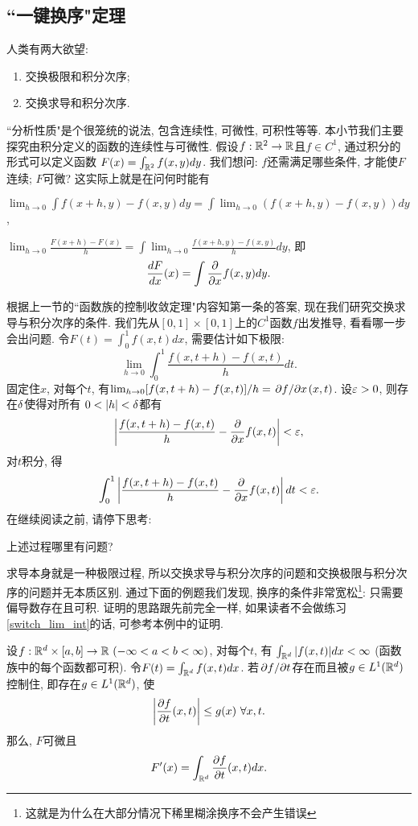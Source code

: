 \subsection{``一键换序"定理}
人类有两大欲望:
\begin{enumerate}
    \item 交换极限和积分次序;
    \item 交换求导和积分次序.
\end{enumerate}
``分析性质"是个很笼统的说法, 包含连续性, 可微性, 可积性等等. 本小节我们主要探究由积分定义的函数的连续性与可微性. 
假设$f: \mathbb{R}^2 \to \mathbb{R}$且$f \in C^1$, 通过积分的形式可以定义函数
$F(x) = \int_{\mathbb{R}^2} f(x,y)dy$. 我们想问: $f$还需满足哪些条件, 才能使$F$连续; $F$可微? 这实际上就是在问何时能有
\begin{enumerate}
{\everymath{\displaystyle}
    \item $\lim_{h \to 0} \int f(x+h,y)-f(x,y) dy = \int \lim_{h \to 0} (f(x+h,y)-f(x,y)) dy$,
    \item $\lim_{h \to 0} \frac{F(x+h)-F(x)}{h} = \int \lim_{h \to 0} \frac{f(x+h,y)-f(x,y)}{h} dy$, 即
    $$\frac{dF}{dx}(x) = \int \pdv{}{x}f(x,y) dy.$$
}
\end{enumerate}
根据上一节的``函数族的控制收敛定理"内容知第一条的答案, 现在我们研究交换求导与积分次序的条件.
我们先从$[0,1] \times [0,1]$上的$C^1$函数$f$出发推导, 看看哪一步会出问题.
令$F(t) = \int_0^1 f(x,t)dx$, 需要估计如下极限:
$$\lim_{h \to 0}\int_0^1 \frac{f(x,t+h)-f(x,t)}{h}dt.$$
固定住$x$, 对每个$t$, 有$\lim_{h \to 0}[f(x,t+h)-f(x,t)]/h = 
{\pdv*{f}{x}} (x,t)$. 
设$\varepsilon>0$, 则存在$\delta$使得对所有
$0<|h|<\d$都有
$$\left|\frac{f(x,t+h)-f(x,t)}{h} - \pdv{}{x}f(x,t)\right| < \varepsilon,$$
对$t$积分, 得
$$\int_0^1 \left|\frac{f(x,t+h)-f(x,t)}{h} - \pdv{}{x}f(x,t)\right| dt < \varepsilon.$$
在继续阅读之前, 请停下思考:
\begin{exercise}
    上述过程哪里有问题?
\end{exercise}
求导本身就是一种极限过程, 所以交换求导与积分次序的问题和交换极限与积分次序的问题并无本质区别. 通过下面的例题我们发现, 换序的条件非常宽松\footnote{这就是为什么在大部分情况下稀里糊涂换序不会产生错误}: 只需要偏导数存在且可积. 证明的思路跟先前完全一样, 如果读者不会做练习\ref{switch_lim_int}的话, 可参考本例中的证明. 
\begin{example}
    设$f:\mathbb{R}^d \times [a,b] \to \mathbb{R} ~(-\infty<a<b<\infty)$, 对每个$t$, 有
    $\int_{\mathbb{R}^d} |f(x,t)|dx < \infty~$(函数族中的每个函数都可积). 令$F(t)=\int_{\mathbb{R}^d} f(x,t)dx$.
    若$\pdv*{f}{t}$存在而且被$g \in L^1(\mathbb{R}^d)$控制住, 即存在$g \in L^1(\mathbb{R}^d)$, 使
    $$\left|{\pdv{f}{t}}(x,t) \right| \leq g(x) ~\forall x,t.$$
    那么, $F$可微且
    $$F'(x)=\int_{\mathbb{R}^d} {\pdv{f}{t}}(x,t) dx.$$
\end{example}
